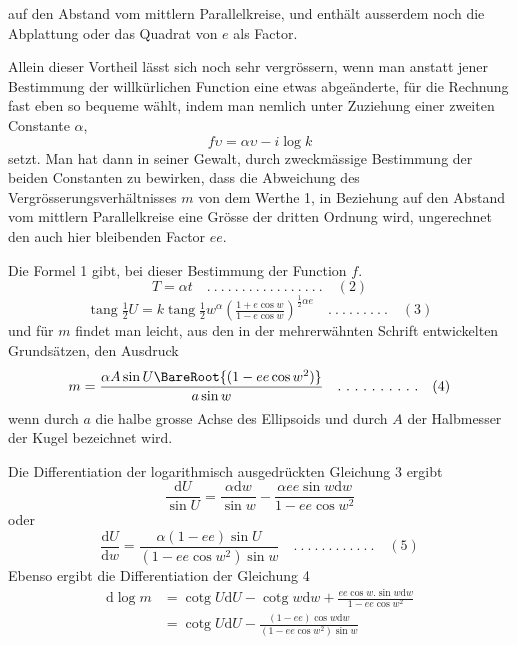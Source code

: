 %
auf den Abstand vom mittlern Parallelkreise, und enthält ausserdem noch die Abplattung oder das Quadrat von \(e\) als Factor.

Allein dieser Vortheil lässt sich noch sehr vergrössern, wenn man anstatt jener Bestimmung der willkürlichen Function eine etwas abgeänderte, für die Rechnung fast eben so bequeme wählt, indem man nemlich unter Zuziehung einer zweiten Constante \(\alpha\),
\[
f\upsilon=\alpha\upsilon-i\log k
\]
setzt. Man hat dann in seiner Gewalt, durch zweckmässige Bestimmung der beiden Constanten zu bewirken, dass die Abweichung des Vergrösserungsverhältnisses \(m\) von dem Werthe 1, in Beziehung auf den Abstand vom mittlern Parallelkreise eine Grösse der dritten Ordnung wird, ungerechnet den auch hier bleibenden Factor \(ee\).

\indent Die Formel 1 gibt, bei dieser Bestimmung der Function \(f\).
\[
T=\alpha t \quad .\ .\ .\ .\ .\ .\ .\ .\ .\ .\ .\ .\ .\ .\ .\ .\ .\quad(2)
\]
\[
\operatorname{tang}\tfrac{1}{2}U=k\operatorname{tang}\tfrac{1}{2}w^\alpha(\tfrac{1+e\cos w}{1-e\cos w})^{\frac{1}{2}\alpha e} \quad .\ .\ .\ .\ .\ .\ .\ .\ .\quad(3)
\]
und für \(m\) findet man leicht, aus den in der mehrerwähnten Schrift entwickelten Grundsätzen, den Ausdruck
\[
m=\frac{\alpha A\sin U\BareRoot{(1-ee\cos w^2)}}{a\sin w} \quad .\ .\ .\ .\ .\ .\ .\ .\ .\ .\quad(4)
\]
wenn durch \(a\) die halbe grosse Achse des Ellipsoids und durch \(A\) der Halbmesser der Kugel bezeichnet wird.

Die Differentiation der logarithmisch ausgedrückten Gleichung 3 ergibt
\[
\frac{\mathrm{d}U}{\sin U}=\frac{\alpha\mathrm{d}w}{\sin w}-\frac{\alpha ee\sin w\mathrm{d}w}{1-ee\cos w^2}
\]
oder
\[
\frac{\mathrm{d}U}{\mathrm{d}w}=\frac{\alpha(1-ee)\sin U}{(1-ee\cos w^2)\sin w} \quad .\ .\ .\ .\ .\ .\ .\ .\ .\ .\ .\ .\quad(5)
\]
Ebenso ergibt die Differentiation der Gleichung 4
\[
\begin{aligned}
\mathrm{d}\log m&=\operatorname{cotg}U\mathrm{d}U-\operatorname{cotg}w\mathrm{d}w+\frac{ee\cos w\mathord{.}\sin w\mathrm{d}w}{1-ee\cos w^2}\\
&=\operatorname{cotg}U\mathrm{d}U-\frac{(1-ee)\cos w\mathrm{d}w}{(1-ee\cos w^2)\sin w}
\end{aligned}
\]
